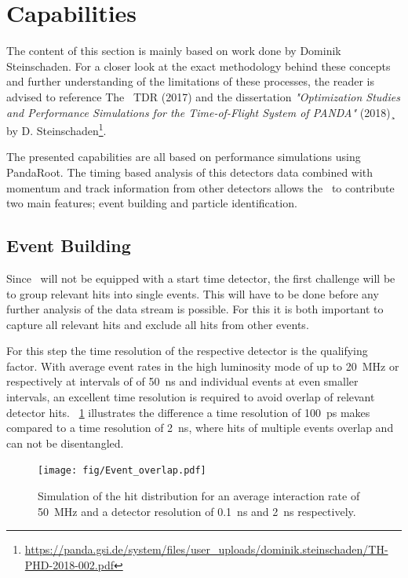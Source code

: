 \documentclass[../BTOF_summary.tex]{subfiles}
\begin{document}
\section{Capabilities}

The content of this section is mainly based on work done by Dominik Steinschaden.
For a closer look at the exact methodology behind these concepts and further understanding of the limitations of these processes, the reader is advised to reference The \btof\ TDR (2017) and the dissertation \emph{"Optimization Studies and Performance Simulations for the Time-of-Flight System of PANDA"} (2018)¸ by D. Steinschaden\footnote{\url{https://panda.gsi.de/system/files/user_uploads/dominik.steinschaden/TH-PHD-2018-002.pdf}}.

The presented capabilities are all based on performance simulations using PandaRoot. The timing based analysis of this detectors data combined with momentum and track information from other detectors allows the \btofD\ to contribute two main features; event building and particle identification.

\subsection{Event Building}

Since \panda\ will not be equipped with a start time detector, the first challenge will be to group relevant hits into single events. This will have to be done before any further analysis of the data stream is possible. For this it is both important to capture all relevant hits and exclude all hits from other events.

For this step the time resolution of the respective detector is the qualifying factor. With average event rates in the high luminosity mode of up to \SI{20}{MHz} or respectively at intervals of of \SI{50}{ns} and individual events at even smaller intervals, an excellent time resolution is required to avoid overlap of relevant detector hits. \fig~\ref{fig:Event_overlap} illustrates the difference a time resolution of \SI{100}{ps} makes compared to a time resolution of \SI{2}{ns}, where hits of multiple events overlap and can not be disentangled.

\begin{figure}[htbp]
	\centering
	\texttt{[image: fig/Event\_overlap.pdf]}
	\caption{Simulation of the hit distribution for an average interaction rate of \SI{50}{MHz} and a detector resolution of \SI{0.1}{ns} and \SI{2}{ns} respectively.}
	\label{fig:Event_overlap}
\end{figure}
\end{document}
